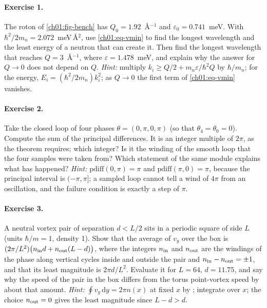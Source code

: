 \paragraph{Exercise 1.} The roton of \cref{ch01:fig-bench} has $Q_0=1.92$~\AA$^{-1}$ and $\varepsilon_0=0.741$~meV. With $\hbar^2/2m_n=2.072$~meV\,\AA$^2$, use \eqref{ch01:eq-vmin} to find the longest wavelength and the least energy of a neutron that can create it. Then find the longest wavelength that reaches $Q=3$~\AA$^{-1}$, where $\varepsilon=1.478$~meV, and explain why the answer for $Q\to0$ does not depend on $Q$. \emph{Hint:} multiply $k_i\ge Q/2+m_n\varepsilon/\hbar^2Q$ by $\hbar/m_n$; for the energy, $E_i=(\hbar^2/2m_n)k_i^2$; as $Q\to0$ the first term of \eqref{ch01:eq-vmin} vanishes.

\paragraph{Exercise 2.} Take the closed loop of four phases $\theta=(0,\pi,0,\pi)$ (so that $\theta_4=\theta_0=0$). Compute the sum of the principal differences. It is an integer multiple of $2\pi$, as the theorem  requires; which integer? Is it the winding of the smooth loop that the four samples were taken from? Which statement of the same module explains what has happened? \emph{Hint:} $\mathrm{pdiff}(0,\pi)=\pi$ and $\mathrm{pdiff}(\pi,0)=\pi$, because the principal interval is $(-\pi,\pi]$; a sampled loop cannot tell a wind of $4\pi$ from an oscillation, and the failure condition is exactly a step of $\pi$.

\paragraph{Exercise 3.} A neutral vortex pair of separation $d<L/2$ sits in a periodic square of side $L$ (units $\hbar/m=1$, density 1). Show that the average of $v_y$ over the box is $(2\pi/L^2)\bigl(n_{\rm in}d+n_{\rm out}(L-d)\bigr)$, where the integers $n_{\rm in}$ and $n_{\rm out}$ are the windings of the phase along vertical cycles inside and outside the pair and $n_{\rm in}-n_{\rm out}=\pm1$, and that its least magnitude is $2\pi d/L^2$. Evaluate it for $L=64$, $d=11.75$, and say why the speed of the pair in the box differs from the torus point-vortex speed by about that amount. \emph{Hint:} $\oint v_y\,\mathrm dy=2\pi n(x)$ at fixed $x$ by ; integrate over $x$; the choice $n_{\rm out}=0$ gives the least magnitude since $L-d>d$.

